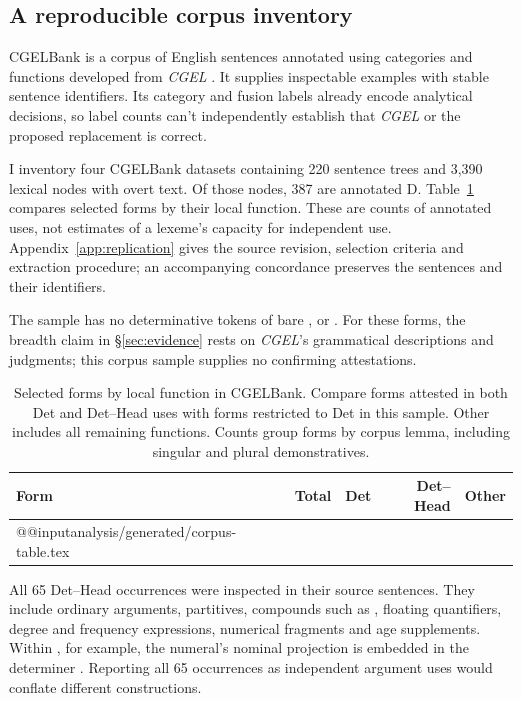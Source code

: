 \documentclass[12pt]{article}
\makeatletter
\newcommand{\tablebody}[1]{\csname @@input\endcsname #1 }
\makeatother
\begin{document}
\subsection{A reproducible corpus inventory}

CGELBank is a corpus of English sentences annotated using categories and functions developed from \textit{CGEL} \citep{reynolds2023unified}. It supplies inspectable examples with stable sentence identifiers. Its category and fusion labels already encode analytical decisions, so label counts can't independently establish that \textit{CGEL} or the proposed replacement is correct.

I inventory four CGELBank datasets containing 220 sentence trees and 3,390 lexical nodes with overt text. Of those nodes, 387 are annotated D. Table~\ref{tab:corpus} compares selected forms by their local function. These are counts of annotated uses, not estimates of a lexeme's capacity for independent use. Appendix~\ref{app:replication} gives the source revision, selection criteria and extraction procedure; an accompanying concordance preserves the sentences and their identifiers.

The sample has no determinative tokens of bare ,  or . For these forms, the breadth claim in §\ref{sec:evidence} rests on \textit{CGEL}'s grammatical descriptions and judgments; this corpus sample supplies no confirming attestations.

\begin{table}[tb]
\centering\small
\caption{Selected forms by local function in CGELBank. Compare forms attested in both Det and Det--Head uses with forms restricted to Det in this sample. Other includes all remaining functions. Counts group forms by corpus lemma, including singular and plural demonstratives.}\label{tab:corpus}
\begin{tabular}{lrrrr}
\toprule
Form & Total & Det & Det--Head & Other \\
\midrule
\tablebody{analysis/generated/corpus-table.tex}
\bottomrule
\end{tabular}
\end{table}

All 65 Det--Head occurrences were inspected in their source sentences. They include ordinary arguments, partitives, compounds such as , floating quantifiers, degree and frequency expressions, numerical fragments and age supplements. Within , for example, the numeral's nominal projection is embedded in the determiner . Reporting all 65 occurrences as independent argument uses would conflate different constructions.
\end{document}
